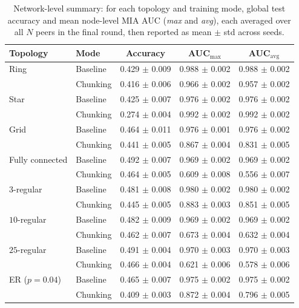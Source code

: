 \begin{table}[t]
  \centering
  \caption{Network-level summary: for each topology and training mode, global test accuracy and mean node-level MIA AUC (\emph{max} and \emph{avg}), each averaged over all $N$ peers in the final round, then reported as mean $\pm$ std across seeds.}
  \label{tab:network_level_summary}
  \small
  \begin{tabular}{@{}l l ccc@{}}
    \toprule
    Topology & Mode & Accuracy & AUC$_{\text{max}}$ & AUC$_{\text{avg}}$ \\
    \midrule
    Ring & Baseline & 0.429 $\pm$ 0.009 & 0.988 $\pm$ 0.002 & 0.988 $\pm$ 0.002 \\
     & Chunking & 0.416 $\pm$ 0.006 & 0.966 $\pm$ 0.002 & 0.957 $\pm$ 0.002 \\
    \midrule
    Star & Baseline & 0.425 $\pm$ 0.007 & 0.976 $\pm$ 0.002 & 0.976 $\pm$ 0.002 \\
     & Chunking & 0.274 $\pm$ 0.004 & 0.992 $\pm$ 0.002 & 0.992 $\pm$ 0.002 \\
    \midrule
    Grid & Baseline & 0.464 $\pm$ 0.011 & 0.976 $\pm$ 0.001 & 0.976 $\pm$ 0.002 \\
     & Chunking & 0.441 $\pm$ 0.005 & 0.867 $\pm$ 0.004 & 0.831 $\pm$ 0.005 \\
    \midrule
    Fully connected & Baseline & 0.492 $\pm$ 0.007 & 0.969 $\pm$ 0.002 & 0.969 $\pm$ 0.002 \\
     & Chunking & 0.464 $\pm$ 0.005 & 0.609 $\pm$ 0.008 & 0.556 $\pm$ 0.007 \\
    \midrule
    $3$-regular & Baseline & 0.481 $\pm$ 0.008 & 0.980 $\pm$ 0.002 & 0.980 $\pm$ 0.002 \\
     & Chunking & 0.445 $\pm$ 0.005 & 0.883 $\pm$ 0.003 & 0.851 $\pm$ 0.005 \\
    \midrule
    $10$-regular & Baseline & 0.482 $\pm$ 0.009 & 0.969 $\pm$ 0.002 & 0.969 $\pm$ 0.002 \\
     & Chunking & 0.462 $\pm$ 0.007 & 0.673 $\pm$ 0.004 & 0.632 $\pm$ 0.004 \\
    \midrule
    $25$-regular & Baseline & 0.491 $\pm$ 0.004 & 0.970 $\pm$ 0.003 & 0.970 $\pm$ 0.003 \\
     & Chunking & 0.466 $\pm$ 0.004 & 0.621 $\pm$ 0.006 & 0.578 $\pm$ 0.006 \\
    \midrule
    ER ($p=0.04$) & Baseline & 0.465 $\pm$ 0.007 & 0.975 $\pm$ 0.002 & 0.975 $\pm$ 0.002 \\
     & Chunking & 0.409 $\pm$ 0.003 & 0.872 $\pm$ 0.004 & 0.796 $\pm$ 0.005 \\

\end{tabular}
\end{table}
